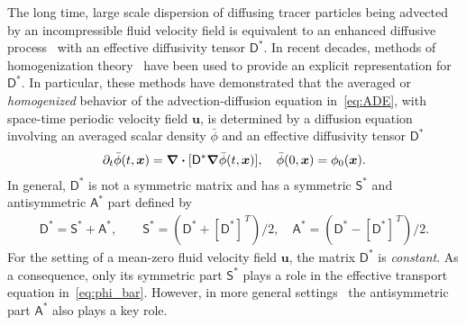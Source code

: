 \documentclass[leqno,onefignum,onetabnum]{siamltex1213}
\newcommand{\Dm}{\mathsf{D}}
\newcommand{\Sm}{\mathsf{S}}
\newcommand{\Am}{\mathsf{A}}
\newcommand\bnabla{\mbox{\boldmath${\nabla}$}}
\providecommand\bcdot{\boldsymbol{\cdot}}
\newcommand{\vecx}{\boldsymbol{x}}
\newcommand{\vecu}{\boldsymbol{u}}
\begin{document}
The long time, large scale dispersion of diffusing tracer particles
being advected by an incompressible fluid velocity field is equivalent
to an enhanced diffusive process~\cite{Taylor:PRSL:196} with an
effective diffusivity tensor $\Dm^*$. In recent decades, methods of
homogenization
theory~\cite{McLaughlin:SIAM_JAM:780,Fannjiang:SIAM_JAM:333,Majda:Kramer:1999:book}
have been used to provide an explicit representation for
$\Dm^*$. In particular, these methods have demonstrated that the
averaged or \emph{homogenized} behavior of the advection-diffusion
equation in~\eqref{eq:ADE}, with space-time periodic velocity field
$\vecu$, is determined by a diffusion equation
involving an averaged scalar density $\bar{\phi}$ and an
effective diffusivity tensor
$\Dm^*$~\cite{Majda:Kramer:1999:book}       
%
\begin{align}\label{eq:phi_bar}
 \partial_t\bar{\phi}(t,\vecx)=\bnabla\bcdot[\Dm^*\bnabla \bar{\phi}(t,\vecx)], \quad
  \bar{\phi}(0,\vecx)=\phi_0(\vecx).
\end{align}
%
In general, $\Dm^*$ is not a symmetric matrix and has a symmetric
$\Sm^*$ and antisymmetric $\Am^*$ part defined by   
%
\begin{align}\label{eq:Symm_Anti-Symm}
  \Dm^*=\Sm^*+\Am^*,\qquad
  \Sm^*=\left(\Dm^*+[\Dm^*]^{\,T}\right)/2, \quad
  \Am^*=\left(\Dm^*-[\Dm^*]^{\,T}\right)/2.
\end{align}
%
For the setting of a mean-zero fluid velocity field $\vecu$, the
matrix $\Dm^*$ is \emph{constant}. As a consequence, only its symmetric
part $\Sm^*$ plays a role in the effective transport equation
in~\eqref{eq:phi_bar}. However, in more general
settings~\cite{Pavliotis:PHD_Thesis,McLaughlin:Forest:PF:1999:880} the
antisymmetric part $\Am^*$ also plays a key role.  
\end{document}
